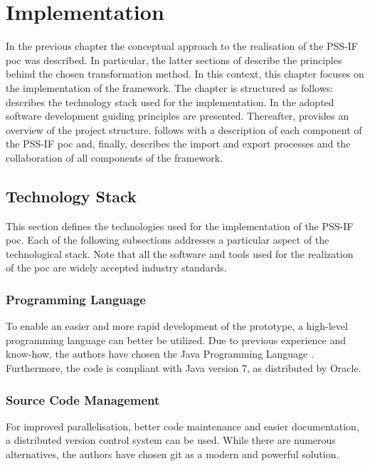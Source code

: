 \chapter{Implementation}
\label{chap:impl}

In the previous chapter the conceptual approach to the realisation of the PSS-IF \gls{poc} was described. In particular, the latter sections of  describe the principles behind the chosen transformation method. In this context, this chapter focuses on the implementation of the framework. The chapter is structured as follows:  describes the technology stack used for the implementation. In  the adopted software development guiding principles are presented. Thereafter,  provides an overview of the project structure.  follows with a description of each component of the PSS-IF \gls{poc} and, finally,  describes the import and export processes and the collaboration of all components of the framework.

\section{Technology Stack}
\label{sec:impl:technology}

This section defines the technologies used for the implementation of the PSS-IF \gls{poc}. Each of the following subsections addresses a particular aspect of the technological stack. Note that all the software and tools used for the realization of the \gls{poc} are widely accepted industry standards.

\subsection{Programming Language}

To enable an easier and more rapid development of the prototype, a high-level programming language can better be utilized. Due to previous experience and know-how, the authors have chosen the Java Programming Language \cite{ref:java}. Furthermore, the code is compliant with Java version 7, as distributed by Oracle. 

\subsection{Source Code Management}

For improved parallelisation, better code maintenance and easier documentation, a distributed version control system can be used. While there are numerous alternatives, the authors have chosen git \cite{ref:git} as a modern and powerful solution.

